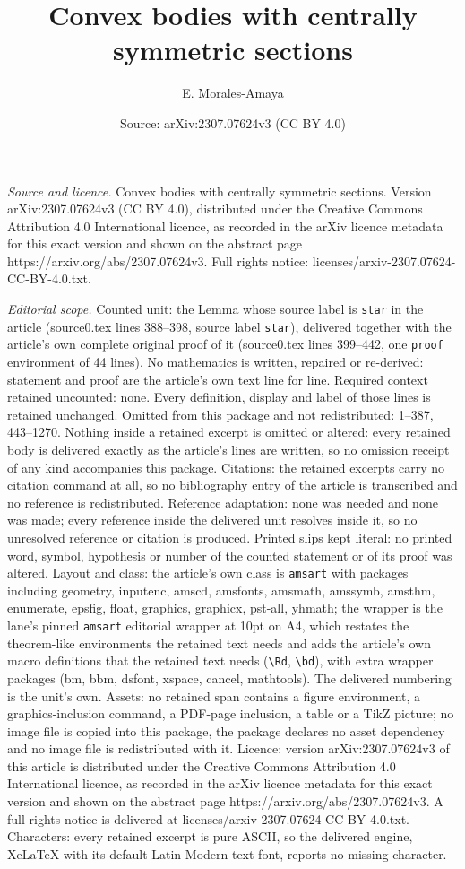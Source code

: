 \documentclass[10pt,a4paper]{amsart}
\title[Convex bodies with centrally symmetric sections]{Convex bodies with centrally symmetric sections}
\author{E. Morales-Amaya}
\date{Source: arXiv:2307.07624v3 (CC BY 4.0)}
\begin{document}
\maketitle

\noindent\emph{Source and licence.} Convex bodies with centrally symmetric sections. Version arXiv:2307.07624v3 (CC BY 4.0), distributed under the Creative Commons Attribution 4.0 International licence, as recorded in the arXiv licence metadata for this exact version and shown on the abstract page https://arxiv.org/abs/2307.07624v3. Full rights notice: licenses/arxiv-2307.07624-CC-BY-4.0.txt.\par\smallskip

\noindent\textit{Editorial scope.} Counted unit: the Lemma whose source label is \texttt{star} in the article (source0.tex lines 388--398, source label \texttt{star}), delivered together with the article's own complete original proof of it (source0.tex lines 399--442, one \texttt{proof} environment of 44 lines). No mathematics is written, repaired or re-derived: statement and proof are the article's own text line for line. Required context retained uncounted: none. Every definition, display and label of those lines is retained unchanged. Omitted from this package and not redistributed: 1--387, 443--1270. Nothing inside a retained excerpt is omitted or altered: every retained body is delivered exactly as the article's lines are written, so no omission receipt of any kind accompanies this package. Citations: the retained excerpts carry no citation command at all, so no bibliography entry of the article is transcribed and no reference is redistributed. Reference adaptation: none was needed and none was made; every reference inside the delivered unit resolves inside it, so no unresolved reference or citation is produced. Printed slips kept literal: no printed word, symbol, hypothesis or number of the counted statement or of its proof was altered. Layout and class: the article's own class is \texttt{amsart} with packages including geometry, inputenc, amscd, amsfonts, amsmath, amssymb, amsthm, enumerate, epsfig, float, graphics, graphicx, pst-all, yhmath; the wrapper is the lane's pinned \texttt{amsart} editorial wrapper at 10pt on A4, which restates the theorem-like environments the retained text needs and adds the article's own macro definitions that the retained text needs (\texttt{\textbackslash Rd}, \texttt{\textbackslash bd}), with extra wrapper packages (bm, bbm, dsfont, xspace, cancel, mathtools). The delivered numbering is the unit's own. Assets: no retained span contains a figure environment, a graphics-inclusion command, a PDF-page inclusion, a table or a TikZ picture; no image file is copied into this package, the package declares no asset dependency and no image file is redistributed with it. Licence: version arXiv:2307.07624v3 of this article is distributed under the Creative Commons Attribution 4.0 International licence, as recorded in the arXiv licence metadata for this exact version and shown on the abstract page https://arxiv.org/abs/2307.07624v3. A full rights notice is delivered at licenses/arxiv-2307.07624-CC-BY-4.0.txt. Characters: every retained excerpt is pure ASCII, so the delivered engine, XeLaTeX with its default Latin Modern text font, reports no missing character.
\end{document}
